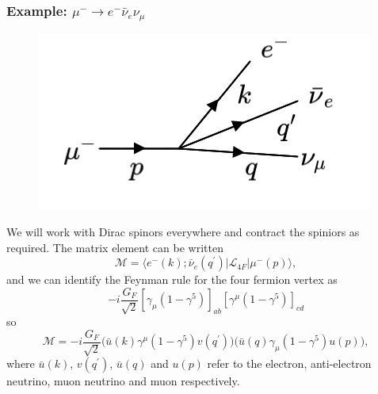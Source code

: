 \documentclass[a4paper,12pt]{article}
\begin{document}
\subsubsection{Example: $\mu^- \to e^- \bar{\nu}_e \nu_\mu$}
\begin{figure}
  \centering
  \includegraphics[width=\linewidth]{figs/diag_1.png}
\end{figure}
We will work with Dirac spinors everywhere and contract the spiniors as required.
The matrix element can be written
\begin{equation}
  \mathcal{M} = \langle e^-(k);\bar{\nu}_e(q^\prime)|\mathcal{L}_{4F}|\mu^-(p) \rangle,
\end{equation}
and we can identify the Feynman rule for the four fermion vertex as 
\begin{equation}
  -i\frac{G_F}{\sqrt{2}} [\gamma_\mu(1-\gamma^5)]_{ab} [\gamma^\mu(1-\gamma^5)]_{cd}
\end{equation}
so 
\begin{equation}
  \mathcal{M} = -i\frac{G_F}{\sqrt{2}} \bigg(\bar{u}(k)\gamma^\mu(1-\gamma^5)v(q^\prime)\bigg) \bigg(\bar{u}(q)\gamma_\mu(1-\gamma^5)u(p)\bigg),
\end{equation}
where $\bar{u}(k)$, $v(q^\prime)$, $\bar{u}(q)$ and $u(p)$ refer to the electron, anti-electron neutrino, muon neutrino and muon respectively. 
\end{document}
